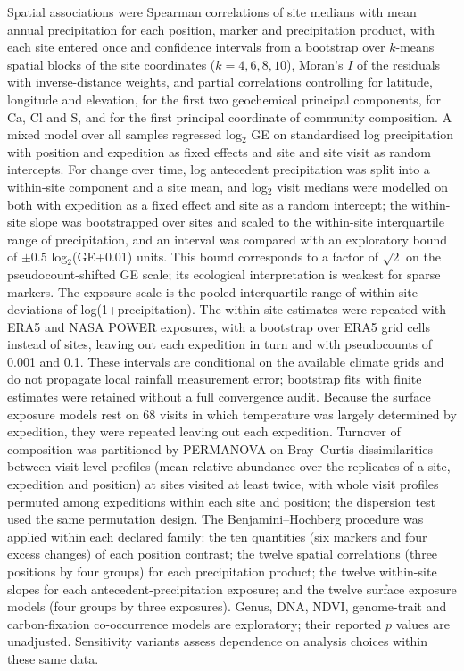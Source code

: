 Spatial associations were Spearman correlations of site medians with mean annual precipitation for each
position, marker and precipitation product, with each site entered once and confidence intervals from a bootstrap over $k$-means spatial blocks of the site
coordinates ($k = 4, 6, 8, 10$), Moran's $I$ of the residuals with inverse-distance weights, and partial
correlations controlling for latitude, longitude and elevation, for the first two geochemical principal
components, for Ca, Cl and S, and for the first principal coordinate of community composition. A mixed
model over all samples regressed log$_2$ GE on standardised log precipitation with position and expedition
as fixed effects and site and site visit as random intercepts. For change over time, log antecedent
precipitation was split into a within-site component and a site mean, and log$_2$ visit medians were
modelled on both with expedition as a fixed effect and site as a random intercept; the within-site slope
was bootstrapped over sites and scaled to the within-site interquartile range of precipitation, and an
interval was compared with an exploratory bound of $\pm 0.5$ log$_2$(GE+0.01) units.
This bound corresponds to a factor of $\sqrt{2}$ on the pseudocount-shifted GE scale; its ecological
interpretation is weakest for sparse markers. The exposure scale is the pooled interquartile range
of within-site deviations of log(1+precipitation). The within-site estimates were repeated with ERA5 and NASA POWER exposures, with a
bootstrap over ERA5 grid cells instead of sites, leaving out each expedition in turn and with pseudocounts
of 0.001 and 0.1. These intervals are conditional on the available climate grids and do not propagate
local rainfall measurement error; bootstrap fits with finite estimates were retained without a full
convergence audit. Because the surface exposure models rest on 68 visits in which temperature was largely
determined by expedition, they were repeated leaving out each expedition. Turnover of composition was
partitioned by PERMANOVA \citep{anderson2001permanova} on Bray--Curtis dissimilarities between visit-level
profiles (mean relative abundance over the replicates of a site, expedition and position) at sites visited
at least twice, with whole visit profiles permuted among expeditions within each site and position; the
dispersion test used the same permutation design. The Benjamini--Hochberg procedure
\citep{benjamini1995fdr} was applied within each declared family: the ten quantities (six markers and four
excess changes) of each position contrast; the twelve spatial correlations (three positions by four groups)
for each precipitation product; the twelve within-site slopes for each antecedent-precipitation exposure;
and the twelve surface exposure models (four groups by three exposures). Genus, DNA, NDVI,
genome-trait and carbon-fixation co-occurrence models are exploratory; their reported $p$ values are
unadjusted. Sensitivity variants assess dependence on analysis choices within these same data.

